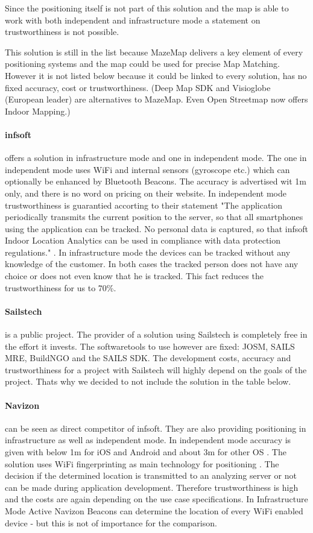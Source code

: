 Since the positioning itself is not part of this solution and the map is able to work with both independent and infrastructure mode a statement on trustworthiness is not possible. 

This solution is still in the list because MazeMap delivers a key element of every positioning systems and the map could be used for precise Map Matching. However it is not listed below because it could be linked to every solution, has no fixed accuracy, cost or trustworthiness. (Deep Map SDK and Visioglobe (European leader) are alternatives to MazeMap. Even Open Streetmap now offers Indoor Mapping.) 

\paragraph{infsoft} offers a solution in infrastructure mode and one in independent mode. The one in independent mode uses WiFi and internal sensors (gyroscope etc.) which can optionally be enhanced by Bluetooth Beacons. The accuracy is advertised wit 1m only, and there is no word on pricing on their website. 
In independent mode trustworthiness is guarantied accorting to their statement "The application periodically transmits the current position to the server, so that all smartphones using the application can be tracked. No personal data is captured, so that infsoft Indoor Location Analytics can be used in compliance with data protection regulations." \textcite{infsoft}. In infrastructure mode the devices can be tracked without any knowledge of the customer. In both cases the tracked person does not have any choice or does not even know that he is tracked. This fact reduces the trustworthiness for us to 70\%.

\paragraph{Sailstech} is a public project. The provider of a solution using Sailstech is completely free in the effort it invests. The softwaretools to use however are fixed: JOSM, SAILS MRE, BuildNGO and the SAILS SDK. The development costs, accuracy and trustworthiness for a project with Sailstech will highly depend on the goals of the project. Thats why we decided to not include the solution in the table below. 

\paragraph{Navizon} can be seen as direct competitor of infsoft. They are also providing positioning in infrastructure as well as independent mode. In independent mode accuracy is given with below 1m for iOS and Android and about 3m for other OS \parencite{navizon}. The solution uses WiFi fingerprinting as main technology for positioning \parencite{navizon}. The decision if the determined location is transmitted to an analyzing server or not can be made during application development. Therefore trustworthiness is high and the costs are again depending on the use case specifications. In Infrastructure Mode Active Navizon Beacons can determine the location of every WiFi enabled device - but this is not of importance for the comparison. 

